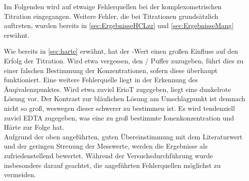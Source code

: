 \documentclass{article}
\begin{document}
        Im Folgenden wird auf etwaige Fehlerquellen bei der komplexometrischen Titration eingegangen. Weitere Fehler, die bei Titrationen grundsätzlich auftreten, wurden bereits in \ref{sec:ErgebnisseHCLzz} und \ref{sec:ErgebnisseMang} erwähnt.  
        
        Wie bereits in \ref{sec:harte} erwähnt, hat der \pH-Wert einen großen Einfluss auf den Erfolg der Titration. Wird etwa vergessen, den / Puffer zuzugeben, führt dies zu einer falschen Bestimmung der Konzentrationen, sofern diese überhaupt funktioniert. Eine weitere Fehlerquelle liegt in der Erkennung des Äuqivalenzpunktes. Wird etwa zuviel ErioT zugegeben, liegt eine dunkelrote Lösung vor. Der Kontrast zur bläulichen Lösung am Umschlagpunkt ist demnach nicht so groß, weswegen dieser schwerer zu bestimmen ist. Es wird tendenziell zuviel EDTA zugegeben, was eine zu groß bestimmte Ionenkonzentration und Härte zur Folge hat. \\
        
       Aufgrund der oben angeführten, guten Übereinstimmung mit dem Literaturwert und der geringen Streuung der Messwerte, werden die Ergebnisse als zufriedenstellend bewertet. Während der Versuchsdurchführung wurde insbesondere darauf geachtet, die angeführten Fehlerquellen möglichst zu vermeiden.
       
  \pagebreak
  
  \listofreactions
  \printbibliography[title=Literaturverzeichnis]
  \listoftables
  
\end{document}
